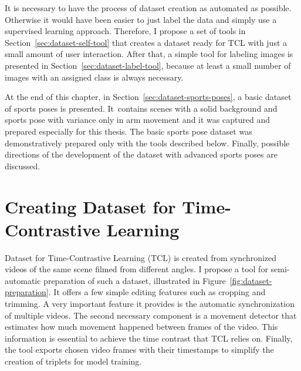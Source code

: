 It is necessary to have the process of dataset creation as automated as possible. Other\-wise it would have been easier to just label the data and simply use a supervised learning approach. Therefore, I propose a set of tools in Section~\ref{sec:dataset-self-tool} that creates a dataset ready for TCL with just a small amount of user interaction. After that, a simple tool for labeling images is presented in Section~\ref{sec:dataset-label-tool}, because at least a small number of images with an assigned class is always necessary.

At the end of this chapter, in Section~\ref{sec:dataset-sports-poses}, a basic dataset of sports poses is presented. It~contains scenes with a solid background and sports pose with variance only in arm movement and it was captured and prepared especially for this thesis. The basic sports pose dataset was demonstratively prepared only with the tools described below. Finally, possible directions of the development of the dataset with advanced sports poses are discussed.

\section{\label{sec:dataset-self-tool}Creating Dataset for Time-Contrastive Learning}

Dataset for Time-Contrastive Learning (TCL) is created from synchronized videos of the same scene filmed from different angles. I propose a tool for semi-automatic preparation of such a dataset, illustrated in Figure~\ref{fig:dataset-preparation}. It offers a few simple editing features such as cropping and trimming. A very important feature it provides is the automatic synchronization of multiple videos. The second necessary component is a movement detector that estimates how much movement happened between frames of the video. This information is essential to achieve the time contrast that TCL relies on. Finally, the tool exports chosen video frames with their timestamps to simplify the creation of triplets for model training.

